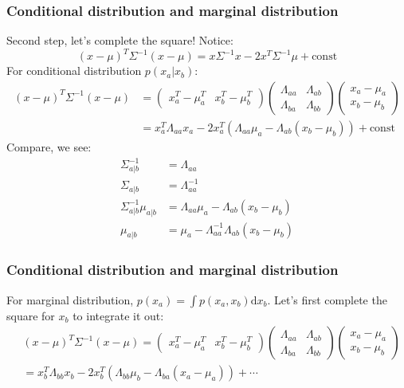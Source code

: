 \documentclass{beamer}
\begin{document}
\begin{frame}
    \frametitle{Conditional distribution and marginal distribution}
    Second step, let's complete the square! Notice:
    \begin{equation*}
        (x-\mu)^{T}\Sigma^{-1}(x-\mu)=x\Sigma^{-1}x-2x^{T}\Sigma^{-1}\mu+\mathrm{const}
    \end{equation*}
    For conditional distribution $p(x_{a}|x_{b})$:
    \begin{align*}
        (x-\mu)^{T}\Sigma^{-1}(x-\mu)&=\begin{pmatrix}
            x_{a}^{T}-\mu_{a}^{T}&x_{b}^{T}-\mu_{b}^{T}
        \end{pmatrix}
        \begin{pmatrix}
            \Lambda_{aa}&\Lambda_{ab} \\
            \Lambda_{ba}&\Lambda_{bb}
        \end{pmatrix}
        \begin{pmatrix}
            x_{a}-\mu_{a} \\
            x_{b}-\mu_{b}
        \end{pmatrix} \\
        &=x_{a}^{T}\Lambda_{aa}x_{a}-2x_{a}^{T}(\Lambda_{aa}\mu_{a}-\Lambda_{ab}(x_{b}-\mu_{b}))+\mathrm{const}
    \end{align*}
    Compare, we see:
    \begin{align*}
        \Sigma_{a|b}^{-1}&=\Lambda_{aa} \\
        \Sigma_{a|b}&=\Lambda_{aa}^{-1} \\
        \Sigma_{a|b}^{-1}\mu_{a|b}&=\Lambda_{aa}\mu_{a}-\Lambda_{ab}(x_{b}-\mu_{b}) \\
        \mu_{a|b}&=\mu_{a}-\Lambda_{aa}^{-1}\Lambda_{ab}(x_{b}-\mu_{b})
    \end{align*}
\end{frame}

\begin{frame}
    \frametitle{Conditional distribution and marginal distribution}
    For marginal distribution, $p(x_{a})=\int{}p(x_{a},x_{b})\mathrm{d}x_{b}$. Let's first complete the square for $x_{b}$ to integrate it out:
    \begin{align*}
        &(x-\mu)^{T}\Sigma^{-1}(x-\mu)=\begin{pmatrix}
            x_{a}^{T}-\mu_{a}^{T}&x_{b}^{T}-\mu_{b}^{T}
        \end{pmatrix}
        \begin{pmatrix}
            \Lambda_{aa}&\Lambda_{ab} \\
            \Lambda_{ba}&\Lambda_{bb}
        \end{pmatrix}
        \begin{pmatrix}
            x_{a}-\mu_{a} \\
            x_{b}-\mu_{b}
        \end{pmatrix} \\
        &=x_{b}^{T}\Lambda_{bb}x_{b}-2x_{b}^{T}(\Lambda_{bb}\mu_{b}-\Lambda_{ba}(x_{a}-\mu_{a}))+\cdots
    \end{align*}
\end{frame}
\end{document}
